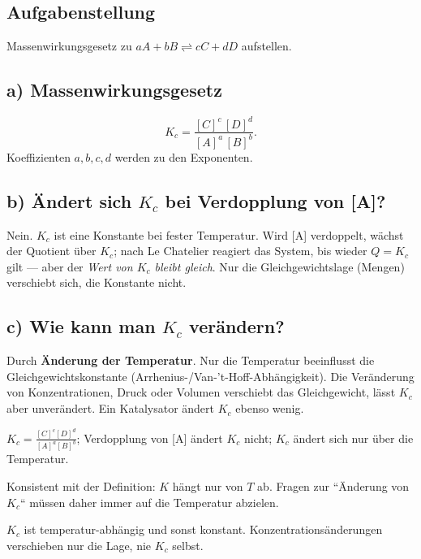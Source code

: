
\subsection*{Aufgabenstellung}
Massenwirkungsgesetz zu $aA + bB \rightleftharpoons cC + dD$ aufstellen.

\subsection*{a) Massenwirkungsgesetz}
\[
  K_c = \frac{[C]^c\,[D]^d}{[A]^a\,[B]^b}.
\]
Koeffizienten $a,b,c,d$ werden zu den Exponenten.

\subsection*{b) Ändert sich $K_c$ bei Verdopplung von [A]?}
Nein. $K_c$ ist eine Konstante bei fester Temperatur. Wird [A] verdoppelt,
wächst der Quotient über $K_c$; nach Le Chatelier reagiert das System,
bis wieder $Q=K_c$ gilt --- aber der \emph{Wert von $K_c$ bleibt gleich}.
Nur die Gleichgewichtslage (Mengen) verschiebt sich, die Konstante nicht.

\subsection*{c) Wie kann man $K_c$ verändern?}
Durch \textbf{Änderung der Temperatur}. Nur die Temperatur beeinflusst die
Gleichgewichtskonstante (Arrhenius-/Van-'t-Hoff-Abhängigkeit). Die
Veränderung von Konzentrationen, Druck oder Volumen verschiebt das
Gleichgewicht, lässt $K_c$ aber unverändert. Ein Katalysator ändert $K_c$
ebenso wenig.

\begin{ergebnis}
$K_c = \frac{[C]^c[D]^d}{[A]^a[B]^b}$; Verdopplung von [A] ändert $K_c$
nicht; $K_c$ ändert sich nur über die Temperatur.
\end{ergebnis}

\begin{kontrolle}
Konsistent mit der Definition: $K$ hängt nur von $T$ ab. Fragen zur
``Änderung von $K_c$`` müssen daher immer auf die Temperatur abzielen.
\end{kontrolle}

\begin{merksatz}
$K_c$ ist temperatur-abhängig und sonst konstant. Konzentrationsänderungen
verschieben nur die Lage, nie $K_c$ selbst.
\end{merksatz}
